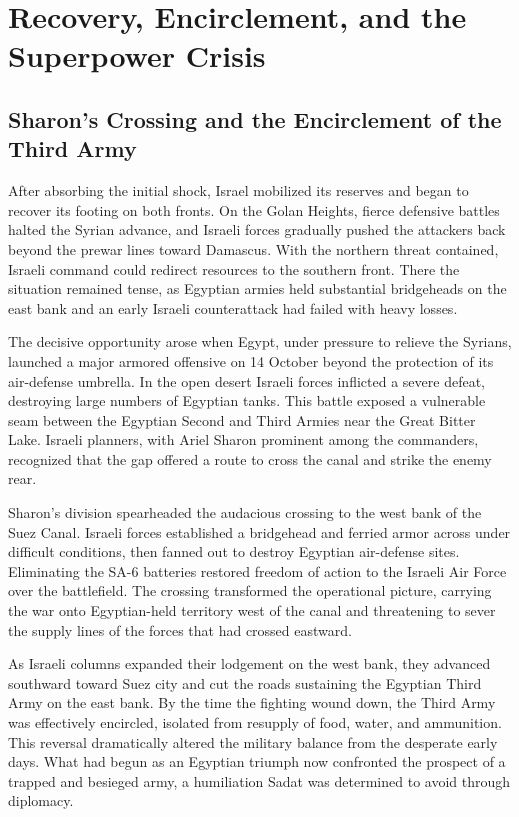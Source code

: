 \section{Recovery, Encirclement, and the Superpower Crisis}

\subsection{Sharon's Crossing and the Encirclement of the Third Army}
After absorbing the initial shock, Israel mobilized its reserves and began to recover its footing on both fronts. On the Golan Heights, fierce defensive battles halted the Syrian advance, and Israeli forces gradually pushed the attackers back beyond the prewar lines toward Damascus. With the northern threat contained, Israeli command could redirect resources to the southern front. There the situation remained tense, as Egyptian armies held substantial bridgeheads on the east bank and an early Israeli counterattack had failed with heavy losses.

The decisive opportunity arose when Egypt, under pressure to relieve the Syrians, launched a major armored offensive on 14 October beyond the protection of its air-defense umbrella. In the open desert Israeli forces inflicted a severe defeat, destroying large numbers of Egyptian tanks. This battle exposed a vulnerable seam between the Egyptian Second and Third Armies near the Great Bitter Lake. Israeli planners, with Ariel Sharon prominent among the commanders, recognized that the gap offered a route to cross the canal and strike the enemy rear.

Sharon's division spearheaded the audacious crossing to the west bank of the Suez Canal. Israeli forces established a bridgehead and ferried armor across under difficult conditions, then fanned out to destroy Egyptian air-defense sites. Eliminating the SA-6 batteries restored freedom of action to the Israeli Air Force over the battlefield. The crossing transformed the operational picture, carrying the war onto Egyptian-held territory west of the canal and threatening to sever the supply lines of the forces that had crossed eastward.

As Israeli columns expanded their lodgement on the west bank, they advanced southward toward Suez city and cut the roads sustaining the Egyptian Third Army on the east bank. By the time the fighting wound down, the Third Army was effectively encircled, isolated from resupply of food, water, and ammunition. This reversal dramatically altered the military balance from the desperate early days. What had begun as an Egyptian triumph now confronted the prospect of a trapped and besieged army, a humiliation Sadat was determined to avoid through diplomacy.

